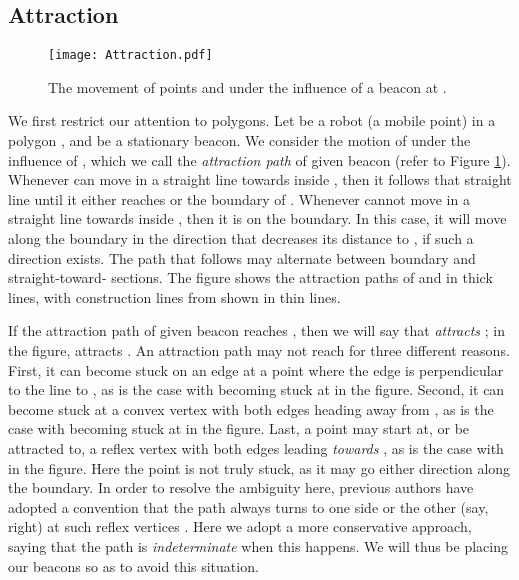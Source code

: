 \documentclass{article}
\begin{document}
	\subsection{Attraction}
		\begin{figure}[htbp] 
			\begin{center}
			    \texttt{[image: Attraction.pdf]} 
			\end{center}
			\caption{
				The movement of points  and  under the influence of a beacon at
				. }
			\label{fig:attraction}
		\end{figure}
		We first restrict our attention to polygons.
		Let  be a robot (a mobile point) in a polygon , and  be a
		stationary beacon. We consider the motion of  under the influence of ,
		which we call the \emph{attraction path} of  given beacon 
		(refer to Figure \ref{fig:attraction}).
		Whenever  can move in a straight
		line towards  inside , then it follows that straight line until it either reaches  or the
		boundary of .
		Whenever  cannot move in a straight line towards  inside , then
		it is on the boundary.
		In this case, it will move along the boundary in the direction that
		decreases its distance to , if such a direction exists.
		The path that  follows may alternate between boundary and
		straight-toward- sections.
		The figure shows the attraction paths of  and  in thick lines,
		with construction lines from  shown in thin lines.
		
		If the attraction path of  given beacon  reaches , then we will
		say that  \emph{attracts} ; in the figure,  attracts .
		An attraction path may not reach  for three different reasons.  First,  it
		can become stuck on an edge at a point where the edge is perpendicular to the
		line to , as is the case with  becoming stuck at  in the figure.
		Second, it can become stuck at a convex vertex with both edges heading away
		from , as is the case with  becoming stuck at  in the figure.
		Last, a point may start at, or be attracted to, a reflex vertex with both
		edges leading \emph{towards} , as is the case with  in the figure.
		Here the point is not truly stuck, as it may go either direction along the
		boundary.
		In order to resolve the ambiguity here, previous authors have
		adopted a convention that the path always turns to one side or the other
		(say, right) at such reflex vertices \cite{biro2013beacon}.  Here we adopt a
		more conservative approach, saying that the path is \emph{indeterminate} when this happens.
		We will thus be placing our beacons so as to avoid this situation.
\end{document}
